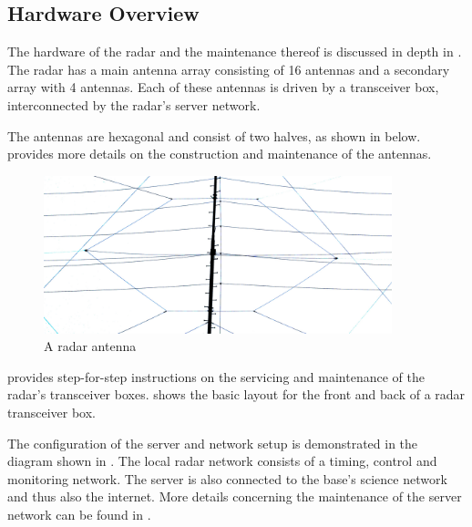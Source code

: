 \clearpage

\subsection{Hardware Overview}
\label{subsec:intro_hw}
The hardware of the radar and the maintenance thereof is discussed in depth in . The radar has a main antenna array consisting of 16 antennas and a secondary array with 4 antennas. Each of these antennas is driven by a transceiver box, interconnected by the radar's server network.
\par
The antennas are hexagonal and consist of two halves, as shown in  below.  provides more details on the construction and maintenance of the antennas.

\vfill
\begin{figure}[H]
	\centering
	\includegraphics[width=0.9\textwidth]{images/introduction/antenna.jpg}
	\caption{A radar antenna}
	\label{fig:intro_antenna}
\end{figure}
\vfill

 provides step-for-step instructions on the servicing and maintenance of the radar's transceiver boxes.  shows the basic layout for the front and back of a radar transceiver box.
\par
The configuration of the server and network setup is demonstrated in the diagram shown in . The local radar network consists of a timing, control and monitoring network. The server is also connected to the base's science network and thus also the internet. More details concerning the maintenance of the server network can be found in .

